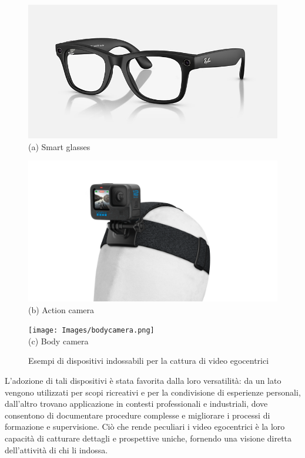 \begin{figure}[ht]
    \centering
    \begin{minipage}{0.3\linewidth}
        \centering
        \includegraphics[width=\linewidth]{Images/meta_glass.png}\\
        (a) Smart glasses
    \end{minipage}
    \hfill
    \begin{minipage}{0.3\linewidth}
        \centering
        \includegraphics[width=\linewidth]{Images/gopro.png}\\
        (b) Action camera
    \end{minipage}
    \hfill
    \begin{minipage}{0.3\linewidth}
        \centering
        \texttt{[image: Images/bodycamera.png]}\\
        (c) Body camera
    \end{minipage}
    \caption{Esempi di dispositivi indossabili per la cattura di video egocentrici}
    \label{fig:dispositivi_egocentrici}
\end{figure}

L'adozione di tali dispositivi è stata favorita dalla loro versatilità: da un lato vengono utilizzati per scopi ricreativi e per la condivisione di esperienze personali, dall'altro trovano applicazione in contesti professionali e industriali, dove consentono di documentare procedure complesse e migliorare i processi di formazione e supervisione. Ciò che rende peculiari i video egocentrici è la loro capacità di catturare dettagli e prospettive uniche, fornendo una visione diretta dell'attività di chi li indossa.

